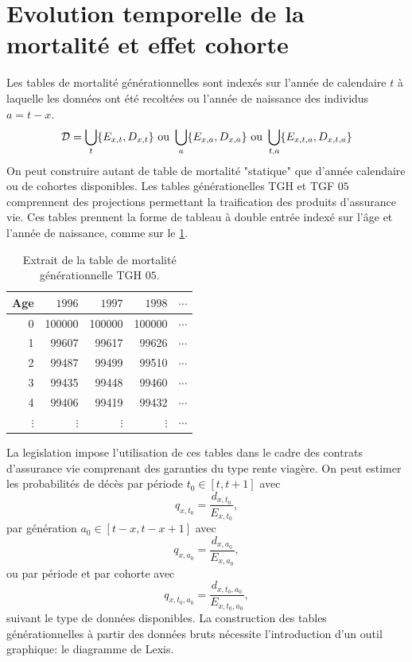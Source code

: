 \section{Evolution temporelle de la mortalité et effet cohorte}
Les tables de mortalité générationnelles sont indexés sur l'année de calendaire $t$ à laquelle les données ont été recoltées ou l'année de naissance des individus $a= t-x$.
$$
\mathcal{D} =  \bigcup_{t} \{E_{x,t}, D_{x,t}\}\text{ ou } \bigcup_{a} \{E_{x,a},D_{x,a}\}\text{ ou } \bigcup_{t,a} \{E_{x,t, a}, D_{x,t, a}\}
$$
On peut construire autant de table de mortalité "statique" que d'année calendaire ou de cohortes disponibles. Les tables générationelles TGH et TGF $05$ comprennent des projections permettant la traification des produits d'assurance vie. Ces tables prennent la forme de tableau à double entrée indexé sur l'âge et l'année de naissance, comme sur le \cref{tab:TGH05}.
\begin{table}[ht!]
\centering
\begin{tabular}{rrrrr}
  \hline
  Age & $1996$ & $1997$ & $1998$ &$\cdots$\\ 
  \hline
0 & 100000 & 100000 & 100000&$\cdots$ \\ 
 1 & 99607 & 99617 & 99626 &$\cdots$\\ 
 2 & 99487 & 99499 & 99510&$\cdots$ \\ 
 3 & 99435 & 99448 & 99460&$\cdots$ \\ 
 4 & 99406 & 99419 & 99432&$\cdots$ \\ 
$\vdots$ & $\vdots$ & $\vdots$ & $\vdots$&$\cdots$ \\ 
   \hline
\end{tabular}
\caption{Extrait de la table de mortalité générationnelle TGH $05$.}
\label{tab:TGH05}
\end{table}
La legislation impose l'utilisation de ces tables dans le cadre des contrats d'assurance vie comprenant des garanties du type rente viagère. On peut estimer les probabilités de décès par période $t_0\in[t, t+1]$ avec 
$$
q_{x,t_0} = \frac{d_{x,t_0}}{E_{x,t_0}},
$$
par génération $a_0\in[t-x, t-x+1]$ avec
$$
q_{x,a_0} = \frac{d_{x,a_0}}{E_{x,a_0}},
$$
ou par période et par cohorte avec
$$
q_{x,t_0, a_0} = \frac{d_{x,t_0, a_0}}{E_{x,t_0, a_0}},
$$
suivant le type de données disponibles. La construction des tables générationnelles à partir des données bruts nécessite l'introduction d'un outil graphique: le diagramme de Lexis.
